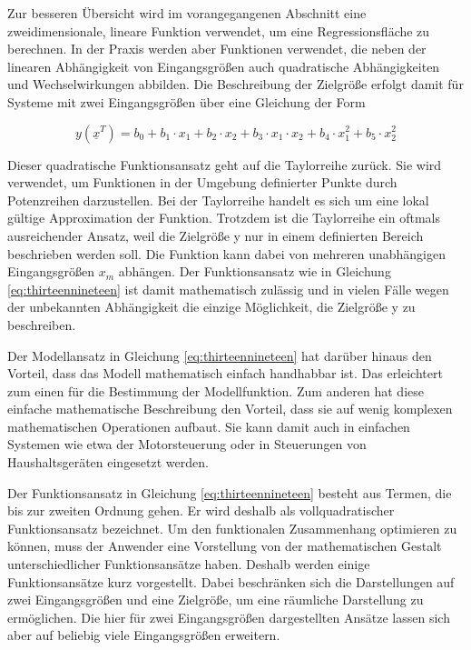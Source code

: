\noindent Zur besseren \"{U}bersicht wird im vorangegangenen Abschnitt eine zweidimensionale, lineare Funktion verwendet, um eine Regressionsfl\"{a}che zu berechnen. In der Praxis werden aber Funktionen verwendet, die neben der linearen Abh\"{a}ngigkeit von Eingangsgr\"{o}{\ss}en auch quadratische Abh\"{a}ngigkeiten und Wechselwirkungen abbilden. Die Beschreibung der Zielgr\"{o}{\ss}e erfolgt damit f\"{u}r Systeme mit zwei Eingangsgr\"{o}{\ss}en \"{u}ber eine Gleichung der Form

\begin{equation}\label{eq:thirteennineteen}
y\left(\underline{x}^{T} \right)=b_{0} +b_{1} \cdot x_{1} +b_{2} \cdot x_{2} +b_{3} \cdot x_{1} \cdot x_{2} +b_{4} \cdot x_{1}^{2} +b_{5} \cdot x_{2}^{2}
\end{equation}

\noindent Dieser quadratische Funktionsansatz geht auf die Taylorreihe zur\"{u}ck. Sie wird verwendet, um Funktionen in der Umgebung definierter Punkte durch Potenzreihen darzustellen. Bei der Taylorreihe handelt es sich um eine lokal g\"{u}ltige Approximation der Funktion. Trotzdem ist die Taylorreihe ein oftmals ausreichender Ansatz, weil die Zielgr\"{o}{\ss}e y nur in einem definierten Bereich beschrieben werden soll. Die Funktion kann dabei von mehreren unabh\"{a}ngigen Eingangsgr\"{o}{\ss}en $x_{m}$ abh\"{a}ngen. Der Funktionsansatz wie in Gleichung \eqref{eq:thirteennineteen} ist damit mathematisch zul\"{a}ssig und in vielen F\"{a}lle wegen der unbekannten Abh\"{a}ngigkeit die einzige M\"{o}glichkeit, die Zielgr\"{o}{\ss}e y zu beschreiben.\newline

\noindent Der Modellansatz in Gleichung \eqref{eq:thirteennineteen} hat dar\"{u}ber hinaus den Vorteil, dass das Modell mathematisch einfach handhabbar ist. Das erleichtert zum einen f\"{u}r die Bestimmung der Modellfunktion. Zum anderen hat diese einfache mathematische Beschreibung den Vorteil, dass sie auf wenig komplexen mathematischen Operationen aufbaut. Sie kann damit auch in einfachen Systemen wie etwa der Motorsteuerung oder in Steuerungen von Haushaltsger\"{a}ten eingesetzt werden.\newline

\noindent Der Funktionsansatz in Gleichung \eqref{eq:thirteennineteen} besteht aus Termen, die bis zur zweiten Ordnung gehen. Er wird deshalb als vollquadratischer Funktionsansatz bezeichnet. Um den funktionalen Zusammenhang optimieren zu k\"{o}nnen, muss der Anwender eine Vorstellung von der mathematischen Gestalt unterschiedlicher Funktionsans\"{a}tze haben. Deshalb werden einige Funktionsans\"{a}tze kurz vorgestellt. Dabei beschr\"{a}nken sich die Darstellungen auf zwei Eingangsgr\"{o}{\ss}en und eine Zielgr\"{o}{\ss}e, um eine r\"{a}umliche Darstellung zu erm\"{o}glichen. Die hier f\"{u}r zwei Eingangsgr\"{o}{\ss}en dargestellten Ans\"{a}tze lassen sich aber auf beliebig viele Eingangsgr\"{o}{\ss}en erweitern.\bigskip

